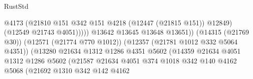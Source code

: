 \begin{lexlean}{RustStd}
\begin{coremodule}
                                                            @4173
                                                            (@21810
                                                              @151
                                                              @342
                                                              @151
                                                              @4218
                                                              (@12447 (@21815 @151))
                                                              @12849)
                                                            (@12549 @21743 @4051)))))
                                                    @13642
                                                    @13645
                                                    @13648
                                                    @13651))
                                                (@14315 (@21769 @30))
                                                (@12571 (@21774 @770 @1012))
                                                (@12357 (@21781 @1012 @332 @5064 @4351))
                                                (@13280
                                                  @21634
                                                  @1312
                                                  @1286
                                                  @4351
                                                  @5602
                                                  (@14359
                                                    @21634
                                                    @4051
                                                    @1312
                                                    @1286
                                                    @5602
                                                    (@21587
                                                      @21634
                                                      @4051
                                                      @374
                                                      @1018
                                                      @342
                                                      @140
                                                      @4162
                                                      @5068
                                                      (@21692
                                                        @1310
                                                        @342
                                                        @142
                                                        @4162

\end{coremodule}
\end{lexlean}
